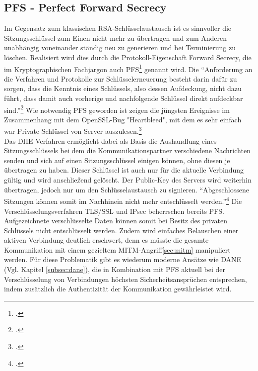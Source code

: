 \documentclass  [paper=a4,
				fontsize=12pt,
				listof=totoc,
				bibliography=totoc
				]{scrreprt}
\begin{document}
			\subsection{PFS - Perfect Forward Secrecy}
				Im Gegensatz zum klassischen RSA-Schlüsselaustausch ist es sinnvoller die Sitzungsschlüssel %
				zum Einen nicht mehr zu übertragen und zum Anderen unabhängig voneinander ständig neu zu generieren und bei Terminierung zu löschen. Realisiert wird dies durch die Protokoll-Eigenschaft Forward Secrecy, die im Kryptographischen Fachjargon auch \ac{PFS}\footcite[Vgl.][]{Boeck2013} genannt wird. Die ``Anforderung an die Verfahren und Protokolle zur Schlüsselerneuerung besteht darin dafür zu sorgen, dass die Kenntnis eines Schlüssels, also dessen Aufdeckung, nicht dazu führt, dass damit auch vorherige und nachfolgende Schlüssel direkt aufdeckbar sind.''\footcite[S. 439]{Eckert2013} Wie notwendig \ac{PFS} geworden ist zeigen die jüngsten Ereignisse im Zusammenhang mit dem OpenSSL-Bug "Heartbleed", mit dem es sehr einfach war Private Schlüssel von Server auszulesen.\footcite[Vgl. ][]{Zhu2014} \medskip\\
				Das \ac{DHE} Verfahren ermöglicht dabei als Basis die Aushandlung eines Sitzungsschlüssels bei dem die Kommunikationspartner verschiedene Nachrichten senden und sich auf einen Sitzungsschlüssel einigen können, ohne diesen je übertragen zu haben. Dieser Schlüssel ist auch nur für die aktuelle Verbindung gültig und wird anschließend gelöscht. Der Public-Key des Servers wird weiterhin übertragen, jedoch nur um den Schlüsselaustausch zu signieren. ``Abgeschlossene Sitzungen können somit im Nachhinein nicht mehr entschlüsselt werden.''\footcite[Vgl. ][]{Schulz2014} Die Verschlüsselungsverfahren \ac{TLS/SSL} und IPsec beherrschen bereits \ac{PFS}.\medskip\\
				Aufgezeichnete verschlüsselte Daten können somit bei Besitz des privaten Schlüssels nicht entschlüsselt werden. Zudem wird einfaches Belauschen einer aktiven Verbindung deutlich erschwert, denn es müsste die gesamte Kommunikation mit einem gezieltem \ac{MITM}-Angriff\ref{sec:mitm} manipuliert werden. Für diese Problematik gibt es wiederum moderne Ansätze wie DANE (Vgl. Kapitel \ref{subsec:dane}), die in Kombination mit \ac{PFS} aktuell bei der Verschlüsselung von Verbindungen höchsten Sicherheitsansprüchen entsprechen, indem zusätzlich die Authentizität der Kommunikation gewährleistet wird.\medskip\\
\end{document}
